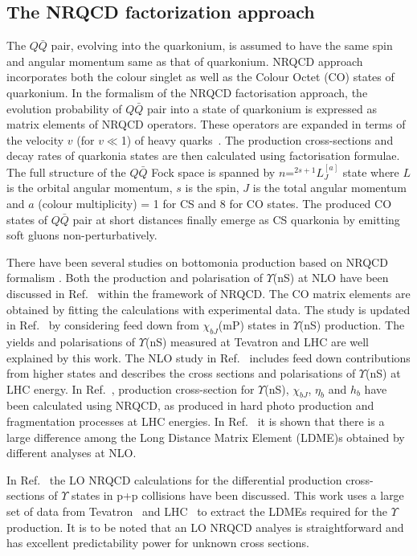 \subsection{The NRQCD factorization approach}


The $Q\bar{Q}$ pair, evolving into the quarkonium,
is assumed to have the same spin and angular momentum same as that of quarkonium.
NRQCD approach incorporates both the colour singlet as
well as the Colour Octet (CO) states of quarkonium.
In the formalism of the NRQCD factorisation approach, the evolution
probability of $Q\bar{Q}$ pair into a state of quarkonium is expressed as matrix
elements of NRQCD operators.
These operators are expanded
in terms of the velocity $v$ (for $v\ll$1) of heavy quarks~\cite{Bodwin:1994jh}.
The production cross-sections and decay rates of quarkonia states are then
calculated using factorisation formulae.
The full structure of the $Q\bar{Q}$ Fock space
is spanned by $n$=$^{2s+1}L_J^{[a]}$ state where $L$ is the orbital angular momentum, $s$
is the spin, $J$ is the total angular momentum
and $a$ (colour multiplicity) = 1 for CS and 8 for CO states. 
The produced CO states of $Q\bar{Q}$ pair at short distances finally emerge as 
CS quarkonia by emitting soft gluons non-perturbatively.


There have been several studies on bottomonia production based on
NRQCD formalism \cite{Domenech:1999qg,Domenech:2000ri,Braaten:2000cm,Gong:2010bk,Sharma:2012dy}.
Both the production and polarisation of $\Upsilon$(nS) at NLO have been discussed in 
Ref.~\cite{Gong:2013qka} within the framework of NRQCD.
The CO matrix elements are obtained by fitting the calculations with experimental data.
The study is updated in Ref.~\cite{Feng:2015wka} by considering
feed down from $\chi_{bJ}$(mP) states in $\Upsilon$(nS) production.
The yields and polarisations of $\Upsilon$(nS) measured at Tevatron and
LHC are well explained by this work.
The NLO study in Ref.~\cite{Han:2014kxa} includes feed down contributions
from higher states and describes the cross sections and
polarisations of $\Upsilon$(nS) at LHC energy.
In Ref.~\cite{Yu:2017pot}, production cross-section for $\Upsilon$(nS),
$\chi_{bJ}$, $\eta_b$ and $h_b$ have been calculated using NRQCD, as produced
in hard photo production and fragmentation processes at LHC energies. 
In Ref.~\cite{Kumar:2021sek} it is shown that there is a large difference among the
Long Distance Matrix Element (LDME)s obtained by different analyses at NLO.

In Ref.~\cite{Kumar:2021sek} the LO NRQCD calculations for the differential production
cross-sections of $\Upsilon$ states in p+p collisions have been discussed. 
This work uses a large set of data from Tevatron~\cite{Acosta:2001gv} and
LHC~\cite{CMS:2013qur,LHCb:2012aa,CMS:2015xqv,ATLAS:2012lmu,CMS:2017dju} 
to extract the LDMEs required for the $\Upsilon$ production.
It is to be noted that an LO NRQCD analyes is straightforward and has excellent
predictability power for unknown cross sections.

